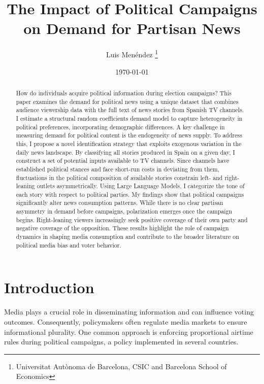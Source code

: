 \documentclass[12pt]{article}
\title{The Impact of Political Campaigns on Demand for Partisan News}
\author{Luis  Menéndez \thanks{Universitat Autònoma de Barcelona, CSIC and Barcelona School of Economics}} %
\date{\today}
\begin{document}
	\maketitle
	
	\begin{abstract}
		
	How do individuals acquire political information during election campaigns? This paper examines the demand for political news using a unique dataset that combines audience viewership data with the full text of news stories from Spanish TV channels. I estimate a structural random coefficients demand model to capture heterogeneity in political preferences, incorporating demographic differences.
	A key challenge in measuring demand for political content is the endogeneity of news supply. To address this, I propose a novel identification strategy that exploits exogenous variation in the daily news landscape. By classifying all stories produced in Spain on a given day, I construct a set of potential inputs available to TV channels. Since channels have established political stances and face short-run costs in deviating from them, fluctuations in the political composition of available stories constrain left- and right-leaning outlets asymmetrically.
	Using Large Language Models, I categorize the tone of each story with respect to political parties. My findings show that political campaigns significantly alter news consumption patterns. While there is no clear partisan asymmetry in demand before campaigns, polarization emerges once the campaign begins. Right-leaning viewers increasingly seek positive coverage of their own party and negative coverage of the opposition. These results highlight the role of campaign dynamics in shaping media consumption and contribute to the broader literature on political media bias and voter behavior.
		
		
		
		
	\end{abstract}
	
	\clearpage
	
	
	
	\section{Introduction }
	
	

Media plays a crucial role in disseminating information and can influence voting outcomes. Consequently, policymakers often regulate media markets to ensure informational plurality. One common approach is enforcing proportional airtime rules during political campaigns, a policy implemented in several countries.
\end{document}
